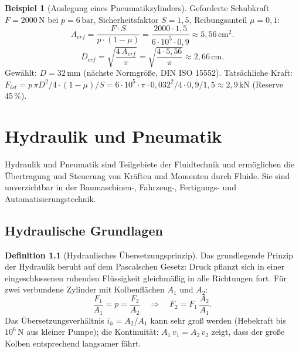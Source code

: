 ﻿\documentclass[a4paper,12pt]{report}
\theoremstyle{definition}
\newtheorem{definition}{Definition}
\newtheorem{beispiel}{Beispiel}
\begin{document}
\begin{beispiel}[Auslegung eines Pneumatikzylinders]
Geforderte Schubkraft $F = 2000\,\mathrm{N}$ bei $p = 6\,\mathrm{bar}$,
Sicherheitsfaktor $S = 1{,}5$, Reibungsanteil $\mu = 0{,}1$:
\[
  A_{erf} = \frac{F\cdot S}{p\cdot(1-\mu)} = \frac{2000\cdot1{,}5}{6\cdot10^5\cdot0{,}9}
  \approx 5{,}56\,\mathrm{cm^2}.
\]
\[
  D_{erf} = \sqrt{\frac{4\,A_{erf}}{\pi}} = \sqrt{\frac{4\cdot5{,}56}{\pi}} \approx 2{,}66\,\mathrm{cm}.
\]
Gewählt: $D = 32\,\mathrm{mm}$ (nächste Normgröße, DIN ISO 15552).
Tatsächliche Kraft: $F_{ist} = p\,\pi D^2/4\cdot(1-\mu)/S = 6\cdot10^5\cdot\pi\cdot0{,}032^2/4\cdot0{,}9/1{,}5
\approx 2{,}9\,\mathrm{kN}$ (Reserve $45\,\%$).
\end{beispiel}

\chapter{Hydraulik und Pneumatik}

Hydraulik und Pneumatik sind Teilgebiete der Fluidtechnik und
ermöglichen die Übertragung und Steuerung von Kräften und Momenten
durch Fluide. Sie sind unverzichtbar in der Baumaschinen-, Fahrzeug-,
Fertigungs- und Automatisierungstechnik.

\section{Hydraulische Grundlagen}

\begin{definition}[Hydraulisches Übersetzungsprinzip]
Das grundlegende Prinzip der Hydraulik beruht auf dem
Pascalschen Gesetz: Druck pflanzt sich in einer eingeschlossenen
ruhenden Flüssigkeit gleichmäßig in alle Richtungen fort.
Für zwei verbundene Zylinder mit Kolbenflächen $A_1$ und $A_2$:
\[
  \frac{F_1}{A_1} = p = \frac{F_2}{A_2}
  \quad\Rightarrow\quad F_2 = F_1\,\frac{A_2}{A_1}.
\]
Das Übersetzungsverhältnis $i_h = A_2/A_1$ kann sehr groß werden
(Hebekraft bis $10^6\,\mathrm{N}$ aus kleiner Pumpe);
die Kontinuität: $A_1\,v_1 = A_2\,v_2$ zeigt, dass der
große Kolben entsprechend langsamer fährt.
\end{definition}
\end{document}
